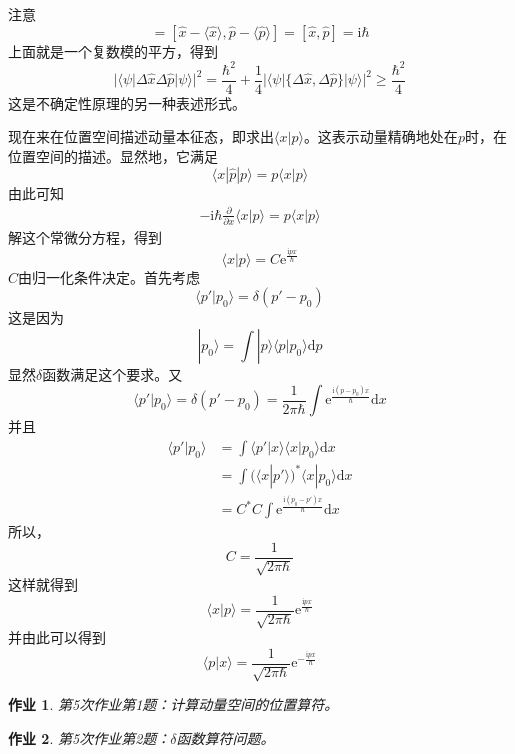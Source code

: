 \documentclass[12pt]{article}
\newtheorem{asg}{作业}
\begin{document}
注意
\begin{equation*}
    [\Delta \hat{x},\Delta \hat{p}] = [\hat{x}-\langle \hat{x} \rangle, \hat{p}-\langle \hat{p} \rangle ] = [\hat{x},\hat{p}] = \mathrm{i}\hbar
\end{equation*}
上面就是一个复数模的平方，得到
\begin{equation*}
    |\langle \psi |\Delta \hat{x} \Delta \hat{p}|\psi \rangle|^2 = \frac {\hbar^2}4 + \frac 14 |\langle \psi |\{\Delta \hat{x},\Delta \hat{p}\}|\psi \rangle|^2 \geqslant \frac {\hbar^2}4
\end{equation*}
这是不确定性原理的另一种表述形式。

现在来在位置空间描述动量本征态，即求出$\langle x|p \rangle$。这表示动量精确地处在$p$时，在位置空间的描述。显然地，它满足
\begin{equation*}
    \langle x|\hat{p}|p\rangle = p\langle x|p \rangle
\end{equation*}
由此可知 
\begin{align*}
    -\mathrm{i}\hbar \frac {\partial}{\partial x} \langle x|p \rangle = p \langle x|p \rangle
\end{align*}
解这个常微分方程，得到
\begin{equation*}
    \langle x|p \rangle = C \mathrm{e}^{\frac {\mathrm{i}px}\hbar}
\end{equation*}
$C$由归一化条件决定。首先考虑
\begin{equation*}
    \langle p' | p_0 \rangle = \delta (p'-p_0)
\end{equation*}
这是因为
\begin{equation*}
    |p_0 \rangle = \int |p\rangle \langle p|p_0\rangle \mathrm{d}p
\end{equation*}
显然$\delta$函数满足这个要求。又
\begin{equation*}
    \langle p' | p_0 \rangle = \delta (p'-p_0) = \frac 1{2\pi\hbar} \int \mathrm{e}^{\frac {\mathrm{i}(p-p_0)x}{\hbar}} \mathrm{d}x
\end{equation*}
并且
\begin{align*}
    \langle p'|p_0 \rangle &= \int \langle p'|x\rangle \langle x|p_0 \rangle \mathrm{d}x\\
    &= \int (\langle x|p' \rangle)^* \langle x|p_0 \rangle \mathrm{d}x\\
    &= C^*C\int \mathrm{e}^{\frac {\mathrm{i}(p_0-p')x}{\hbar}} \mathrm{d}x
\end{align*}
所以， 
\begin{equation*}
    C = \frac 1{\sqrt{2\pi\hbar}}
\end{equation*}
这样就得到 
\begin{equation*}
    \langle x|p \rangle = \frac 1{\sqrt{2\pi\hbar}} \mathrm{e}^{\frac {\mathrm{i}px}{\hbar}}
\end{equation*}
并由此可以得到
\begin{equation*}
    \langle p|x \rangle = \frac 1{\sqrt{2\pi\hbar}} \mathrm{e}^{-\frac {\mathrm{i}px}{\hbar}}
\end{equation*}
\begin{asg}
    第5次作业第1题：计算动量空间的位置算符。
\end{asg}
\begin{asg}
    第5次作业第2题：$\delta$函数算符问题。
\end{asg}
\end{document}
